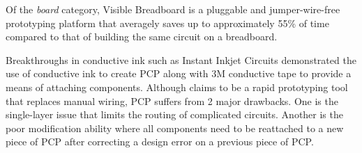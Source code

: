Of the \textit{board} category, Visible Breadboard \cite{Visible_Breadboard} is a pluggable and jumper-wire-free prototyping platform that averagely saves up to approximately 55\% of time compared to that of building the same circuit on a breadboard.

Breakthroughs in conductive ink such as Instant Inkjet Circuits \cite{Instant_Inkjet_Circuits} demonstrated the use of conductive ink to create PCP along with 3M conductive tape to provide a means of attaching components.
Although \cite{Instant_Inkjet_Circuits} claims to be a rapid prototyping tool that replaces manual wiring, PCP suffers from 2 major drawbacks. One is the single-layer issue that limits the routing of complicated circuits. Another is the poor modification ability where all components need to be reattached to a new piece of PCP after correcting a design error on a previous piece of PCP.


